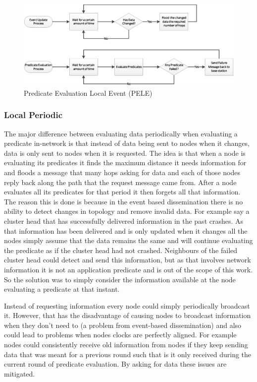 \begin{figure}[H]
\centering
\includegraphics[width=\linewidth]{Diagrams/pele.eps}
\caption{Predicate Evaluation Local Event (PELE)}
\end{figure}

\subsubsection{Local Periodic}

The major difference between evaluating data periodically when evaluating a predicate in-network is that instead of data being sent to nodes when it changes, data is only sent to nodes when it is requested. The idea is that when a node is evaluating its predicates it finds the maximum distance it needs information for and floods a message that many hops asking for data and each of those nodes reply back along the path that the request message came from. After a node evaluates all its predicates for that period it then forgets all that information. The reason this is done is because in the event based dissemination there is no ability to detect changes in topology and remove invalid data. For example say a cluster head that has successfully delivered information in the past crashes. As that information has been delivered and is only updated when it changes all the nodes simply assume that the data remains the same and will continue evaluating the predicate as if the cluster head had not crashed. Neighbours of the failed cluster head could detect and send this information, but as that involves network information it is not an application predicate and is out of the scope of this work. So the solution was to simply consider the information available at the node evaluating a predicate at that instant.

Instead of requesting information every node could simply periodically broadcast it. However, that has the disadvantage of causing nodes to broadcast information when they don't need to (a problem from event-based dissemination) and also could lead to problems when nodes clocks are perfectly aligned. For example nodes could consistently receive old information from nodes if they keep sending data that was meant for a previous round such that is it only received during the current round of predicate evaluation. By asking for data these issues are mitigated.


